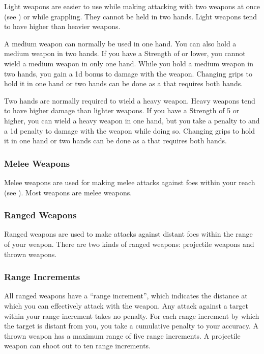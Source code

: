             \label{Light Weapons} Light weapons are easier to use while making attacking with two weapons at once (see ) or while grappling.
            They cannot be held in two hands.
            Light weapons tend to have higher  than heavier weapons.

             A medium weapon can normally be used in one hand.
            You can also hold a medium weapon in two hands.
            If you have a Strength of  or lower, you cannot wield a medium weapon in only one hand.
            While you hold a medium weapon in two hands, you gain a \plus1d bonus to damage with the weapon.
            Changing grips to hold it in one hand or two hands can be done as a  that requires both hands.

             Two hands are normally required to wield a heavy weapon.
            Heavy weapons tend to have higher damage than lighter weapons.
            If you have a Strength of 5 or higher, you can wield a heavy weapon in one hand, but you take a  penalty to  and a \minus1d penalty to damage with the weapon while doing so.
            Changing grips to hold it in one hand or two hands can be done as a  that requires both hands.

        \subsubsection{Melee Weapons}
            Melee weapons are used for making melee attacks against foes within your reach (see ). Most weapons are melee weapons.

        \subsubsection{Ranged Weapons}
            Ranged weapons are used to make attacks against distant foes within the range of your weapon. There are two kinds of ranged weapons: projectile weapons and thrown weapons.

            \subsubsection{Range Increments}\label{Range Increment} All ranged weapons have a ``range increment'', which indicates the distance at which you can effectively attack with the weapon. Any attack against a target within your range increment takes no penalty. For each range increment by which the target is distant from you, you take a cumulative  penalty to your accuracy. A thrown weapon has a maximum range of five range increments. A projectile weapon can shoot out to ten range increments.

